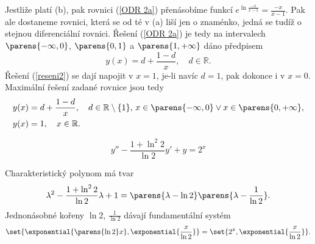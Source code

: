 \documentclass[answers]{exam}
\begin{document}
\begin{questions}
\begin{solution}
		Jestli\v ze plat\'i (b), pak rovnici (\ref{ODR 2a}) p\v ren\'asob\'ime funkc\'i $e^{\ln\frac{-x}{x-1}}=\frac{-x}{x-1}$. Pak ale dostaneme rovnici, kter\'a se od t\'e v (a) li\v s\'i jen o znam\'enko, jedn\'a se tud\'i\v z o stejnou diferenci\'aln\'i rovnici. \v Re\v sen\'i (\ref{ODR 2a}) je tedy na intervalech $\parens{-\infty, 0}$, $\parens{0, 1}$ a $\parens{1, +\infty}$ dáno předpisem
		\begin{equation}\label{reseni2}
		y(x)=d+\frac{1-d}{x},\quad d\in\mathbb R.
		\end{equation}
		Řešení (\ref{reseni2}) se dají napojit v $x=1$, je-li nav\'ic $d=1$, pak dokonce i v $x=0$. Maxim\'aln\'i \v re\v sen\'i zadané rovnice jsou tedy 
		\begin{align*}\label{reseni2a}
		y(x)&=d+\frac{1-d}{x},\quad d\in\mathbb R\setminus\{1\},\, x\in \parens{-\infty,0} \lor x \in \parens{0, + \infty} ,\\
		y(x)&=1,\quad x\in\mathbb R.
		\end{align*}		
	\end{solution}
	
  \question
  \begin{equation*}
    y'' - \frac{1 + \ln^2 2}{\ln 2}y' + y 
    = 
    2^x
  \end{equation*}
    
  \begin{solution}
  	Charakteristický polynom má tvar
  	\begin{equation*}
  		\lambda^2 - \frac{1 + \ln^2 2}{\ln 2} \lambda + 1
  		=
  		\parens{\lambda - \ln 2} \parens{\lambda - \frac{1}{\ln 2}}.
  	\end{equation*}
  	Jednonásobné kořeny $\ln 2$, $\frac{1}{\ln 2}$ dávají fundamentální systém
  	\begin{equation*}
  		\set{\exponential{\parens{\ln 2}x}, \exponential{\frac{x}{\ln 2}}}
  		=
  		\set{2^x, \exponential{\frac{x}{\ln 2}}}.
  	\end{equation*}
  	

\end{solution}
\end{questions}
\end{document}
